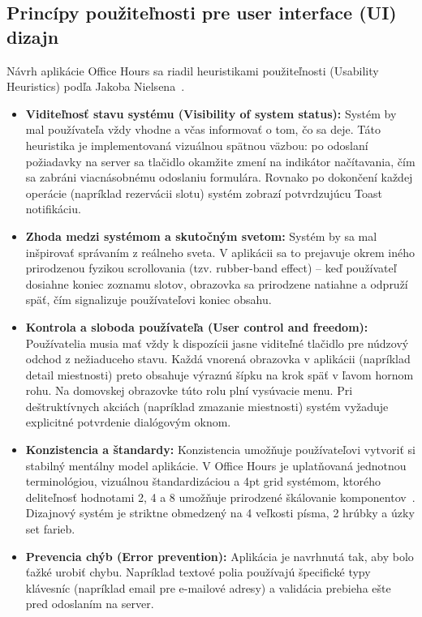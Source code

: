 \subsection{Princípy použiteľnosti pre user interface (UI) dizajn}
Návrh aplikácie Office Hours sa riadil heuristikami použiteľnosti (Usability Heuristics) podľa Jakoba Nielsena~\cite{nielsen}.

\begin{itemize}
    \item \textbf{Viditeľnosť stavu systému (Visibility of system status):} Systém by mal používateľa vždy vhodne a včas informovať o tom, čo sa deje. Táto heuristika je implementovaná vizuálnou spätnou väzbou: po odoslaní požiadavky na server sa tlačidlo okamžite zmení na indikátor načítavania, čím sa zabráni viacnásobnému odoslaniu formulára. Rovnako po dokončení každej operácie (napríklad rezervácii slotu) systém zobrazí potvrdzujúcu Toast notifikáciu.

    \item \textbf{Zhoda medzi systémom a skutočným svetom:} Systém by sa mal inšpirovať správaním z reálneho sveta. V aplikácii sa to prejavuje okrem iného prirodzenou fyzikou scrollovania (tzv. rubber-band effect) – keď používateľ dosiahne koniec zoznamu slotov, obrazovka sa prirodzene natiahne a odpruží späť, čím signalizuje používateľovi koniec obsahu.
    
    \item \textbf{Kontrola a sloboda používateľa (User control and freedom):} Používatelia musia mať vždy k dispozícii jasne viditeľné tlačidlo pre núdzový odchod z nežiaduceho stavu. Každá vnorená obrazovka v aplikácii (napríklad detail miestnosti) preto obsahuje výraznú šípku na krok späť v ľavom hornom rohu. Na domovskej obrazovke túto rolu plní vysúvacie  menu. Pri deštruktívnych akciách (napríklad zmazanie miestnosti) systém vyžaduje explicitné potvrdenie dialógovým oknom.

    \item \textbf{Konzistencia a štandardy:} Konzistencia umožňuje používateľovi vytvoriť si stabilný mentálny model aplikácie. V Office Hours je uplatňovaná jednotnou terminológiou, vizuálnou štandardizáciou a 4pt grid systémom, ktorého deliteľnosť hodnotami 2, 4 a 8 umožňuje prirodzené škálovanie komponentov~\cite{grid4pt}. Dizajnový systém je striktne obmedzený na 4 veľkosti písma, 2 hrúbky a úzky set farieb.

    \item \textbf{Prevencia chýb (Error prevention):} Aplikácia je navrhnutá tak, aby bolo ťažké urobiť chybu. Napríklad textové polia používajú špecifické typy klávesníc (napríklad email pre e-mailové adresy) a validácia prebieha ešte pred odoslaním na server.


\end{itemize}
